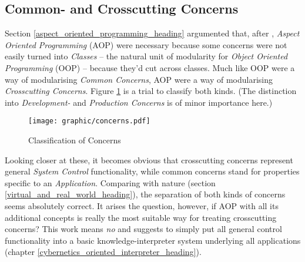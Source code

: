 %
%
%
%
%
%
%

\subsection{Common- and Crosscutting Concerns}
\label{common_and_crosscutting_concerns_heading}

Section \ref{aspect_oriented_programming_heading} argumented that, after
\cite{aspectj}, \emph{Aspect Oriented Programming} (AOP) were necessary because
some concerns were not easily turned into \emph{Classes} -- the natural unit of
modularity for \emph{Object Oriented Programming} (OOP) -- because they'd cut
across classes. Much like OOP were a way of modularising \emph{Common Concerns},
AOP were a way of modularising \emph{Crosscutting Concerns}. Figure
\ref{concerns_figure} is a trial to classify both kinds. (The distinction into
\emph{Development-} and \emph{Production Concerns} is of minor importance here.)

\begin{figure}[ht]
    \begin{center}
        \texttt{[image: graphic/concerns.pdf]}
        \caption{Classification of Concerns}
        \label{concerns_figure}
    \end{center}
\end{figure}

Looking closer at these, it becomes obvious that crosscutting concerns represent
general \emph{System Control} functionality, while common concerns stand for
properties specific to an \emph{Application}. Comparing with nature (section
\ref{virtual_and_real_world_heading}), the separation of both kinds of concerns
seems absolutely correct. It arises the question, however, if AOP with all its
additional concepts is really the most suitable way for treating crosscutting
concerns? This work means \emph{no} and suggests to simply put all general
control functionality into a basic knowledge-interpreter system underlying all
applications (chapter \ref{cybernetics_oriented_interpreter_heading}).
